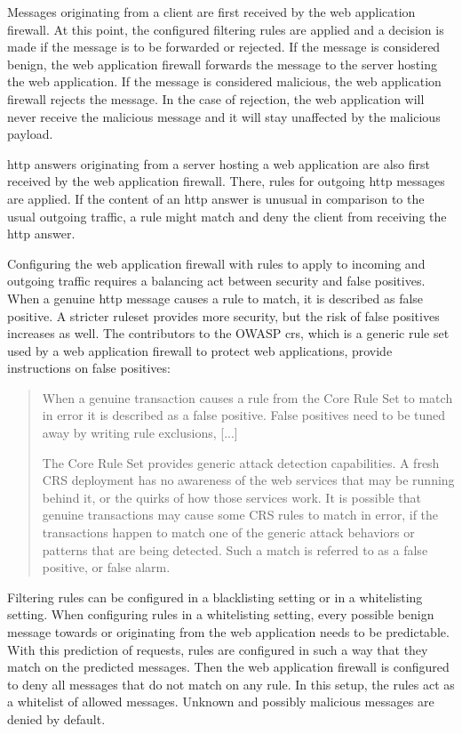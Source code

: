 Messages originating from a client are first received by the web application firewall.
At this point, the configured filtering rules are applied and a decision is made if the message is to be forwarded or rejected.
If the message is considered benign, the web application firewall forwards the message to the server hosting the web application.
If the message is considered malicious, the web application firewall rejects the message.
In the case of rejection, the web application will never receive the malicious message and it will stay unaffected by the malicious payload.

\acrshort{http} answers originating from a server hosting a web application are also first received by the web application firewall.
There, rules for outgoing \acrshort{http} messages are applied.
If the content of an \acrshort{http} answer is unusual in comparison to the usual outgoing traffic, a rule might match and deny the client from receiving the \acrshort{http} answer.

Configuring the web application firewall with rules to apply to incoming and outgoing traffic requires a balancing act between security and false positives.
When a genuine \acrshort{http} message causes a rule to match, it is described as false positive.
A stricter ruleset provides more security, but the risk of false positives increases as well.
The contributors to the OWASP \acrfull{crs}, which is a generic rule set used by a web application firewall to protect web applications, provide instructions on false positives:

\begin{quote}
	When a genuine transaction causes a rule from the Core Rule Set to match in error it is described as a false positive. False positives need to be tuned away by writing rule exclusions, [...]

	The Core Rule Set provides generic attack detection capabilities. A fresh CRS deployment has no awareness of the web services that may be running behind it, or the quirks of how those services work. It is possible that genuine transactions may cause some CRS rules to match in error, if the transactions happen to match one of the generic attack behaviors or patterns that are being detected. Such a match is referred to as a false positive, or false alarm. \cite{OWASP/crsfpt}
\end{quote}

Filtering rules can be configured in a blacklisting setting or in a whitelisting setting.
When configuring rules in a whitelisting setting, every possible benign message towards or originating from the web application needs to be predictable. 
With this prediction of requests, rules are configured in such a way that they match on the predicted messages. 
Then the web application firewall is configured to deny all messages that do not match on any rule. 
In this setup, the rules act as a whitelist of allowed messages. Unknown and possibly malicious messages are denied by default.

